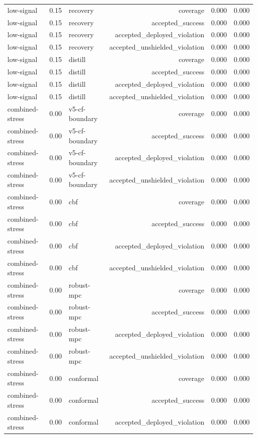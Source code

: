 \documentclass{article}
\begin{document}
\begin{longtable}{@{}lllrrr@{}}
low-signal & 0.15 & recovery & coverage & 0.000 & 0.000 \\
low-signal & 0.15 & recovery & accepted\_success & 0.000 & 0.000 \\
low-signal & 0.15 & recovery & accepted\_deployed\_violation & 0.000 & 0.000 \\
low-signal & 0.15 & recovery & accepted\_unshielded\_violation & 0.000 & 0.000 \\
low-signal & 0.15 & distill & coverage & 0.000 & 0.000 \\
low-signal & 0.15 & distill & accepted\_success & 0.000 & 0.000 \\
low-signal & 0.15 & distill & accepted\_deployed\_violation & 0.000 & 0.000 \\
low-signal & 0.15 & distill & accepted\_unshielded\_violation & 0.000 & 0.000 \\
combined-stress & 0.00 & v5-cf-boundary & coverage & 0.000 & 0.000 \\
combined-stress & 0.00 & v5-cf-boundary & accepted\_success & 0.000 & 0.000 \\
combined-stress & 0.00 & v5-cf-boundary & accepted\_deployed\_violation & 0.000 & 0.000 \\
combined-stress & 0.00 & v5-cf-boundary & accepted\_unshielded\_violation & 0.000 & 0.000 \\
combined-stress & 0.00 & cbf & coverage & 0.000 & 0.000 \\
combined-stress & 0.00 & cbf & accepted\_success & 0.000 & 0.000 \\
combined-stress & 0.00 & cbf & accepted\_deployed\_violation & 0.000 & 0.000 \\
combined-stress & 0.00 & cbf & accepted\_unshielded\_violation & 0.000 & 0.000 \\
combined-stress & 0.00 & robust-mpc & coverage & 0.000 & 0.000 \\
combined-stress & 0.00 & robust-mpc & accepted\_success & 0.000 & 0.000 \\
combined-stress & 0.00 & robust-mpc & accepted\_deployed\_violation & 0.000 & 0.000 \\
combined-stress & 0.00 & robust-mpc & accepted\_unshielded\_violation & 0.000 & 0.000 \\
combined-stress & 0.00 & conformal & coverage & 0.000 & 0.000 \\
combined-stress & 0.00 & conformal & accepted\_success & 0.000 & 0.000 \\
combined-stress & 0.00 & conformal & accepted\_deployed\_violation & 0.000 & 0.000 \\

\end{longtable}
\end{document}

